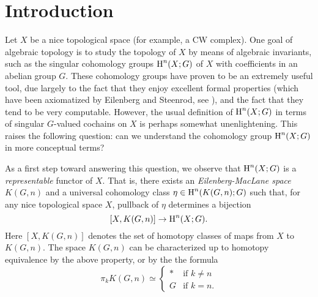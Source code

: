 \maketitle

\section*{Introduction}\label{intro}

\setcounter{theorem}{0}

Let $X$ be a nice topological space (for example, a CW complex). One goal of algebraic topology is to study the topology of $X$ by means of algebraic invariants, such as the singular cohomology groups
$\operatorname{H}^{n}(X;G)$ of $X$ with coefficients in an abelian group $G$. These cohomology groups have proven to be an extremely useful tool, due largely to the fact that they enjoy excellent formal properties (which have been axiomatized by Eilenberg and Steenrod, see \cite{eilenbergsteenrod}), and the fact that they tend to be very computable. However, the usual definition of $\operatorname{H}^{n}(X;G)$ in terms of singular $G$-valued cochains on $X$ is perhaps somewhat unenlightening. This raises the following question: can we understand the cohomology group $\operatorname{H}^{n}(X;G)$ in more conceptual terms?

As a first step toward answering this question, we observe that $\operatorname{H}^{n}(X;G)$ is a {\em representable} functor of $X$. That is, there exists an {\it Eilenberg-MacLane space} $K(G,n)$
and a universal cohomology class $\eta \in \operatorname{H}^{n}( K(G,n); G)$ such that, for any nice topological space $X$, pullback of $\eta$ determines a bijection
$$ [X, K(G,n)] \rightarrow \operatorname{H}^{n}(X;G).$$
Here $[X, K(G,n)]$ denotes the set of homotopy classes of maps from $X$ to $K(G,n)$.
The space $K(G,n)$ can be characterized up to homotopy equivalence by the above property, or by the the formula
$$ \pi_{k} K(G,n) \simeq \begin{cases} \ast & \text{if } k \neq n \\
G & \text{if } k = n. \end{cases}$$

